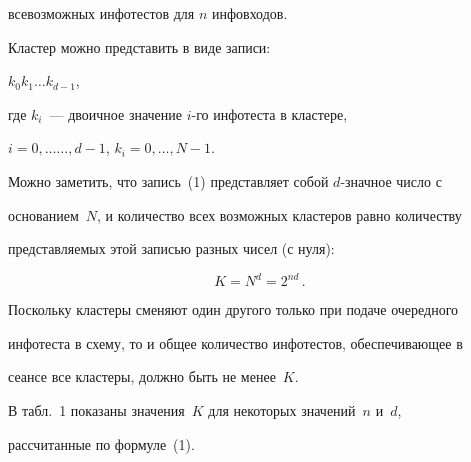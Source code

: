 всевозможных инфотестов для $n$ инфовходов.





Кластер можно представить в виде записи:


$k_0k_1\ldots k_{d-1}$,


где $k_i$~--- двоичное значение $i$-го инфотеста в кластере, 


$i = 0,\ldots $\linebreak $\ldots ,d - 1$, $k_i = 0,\ldots , N - 1$.





Можно заметить, что запись~(1) представляет собой $d$-знач\-ное число с 


основанием~$N$, и количество всех возможных кластеров равно количеству 


представляемых этой записью разных чисел (с нуля):


\begin{equation}


K= N^d = 2^{nd}\,.


\label{e2-4}


\end{equation}





Поскольку кластеры сменяют один другого только при подаче очередного 


инфотеста в схему, то и общее количество инфотестов, обеспечивающее в 


сеансе все кластеры, должно быть не менее~$K$.





В табл.~1 показаны значения~$K$ для некоторых значений~$n$ и~$d$, 


рассчитанные по формуле~(1).





